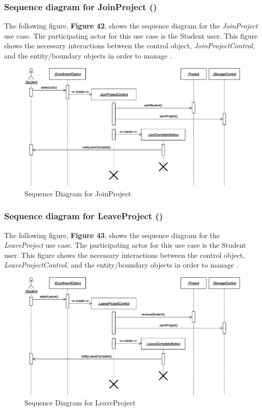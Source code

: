 \documentclass[12pt,letterpaper]{article}
\begin{document}
\subsubsection*{Sequence diagram for JoinProject (\joinproject{})}

The following figure, {\bf Figure 42}, shows the sequence diagram for the {\it JoinProject} use case. The participating actor for this use case is
the Student user. This figure shows the necessary interactions between the control object, {\it JoinProjectControl}, and the
entity/boundary objects in order to manage \joinproject{}.

\begin{figure}[H]
	\centering{}
	\includegraphics[scale=0.3]{imgs/seq/join-project.png}
	\caption{Sequence Diagram for JoinProject}
\end{figure}

\subsubsection*{Sequence diagram for LeaveProject (\leaveproject{})}

The following figure, {\bf Figure 43}, shows the sequence diagram for the {\it LeaveProject} use case. The participating actor for this use case is
the Student user. This figure shows the necessary interactions between the control object, {\it LeaveProjectControl}, and the
entity/boundary objects in order to manage \leaveproject{}.

\begin{figure}[H]
	\centering{}
	\includegraphics[scale=0.3]{imgs/seq/leave-project.png}
	\caption{Sequence Diagram for LeaveProject}
\end{figure}
\end{document}
